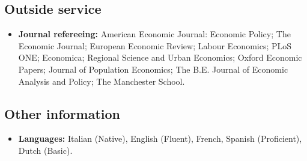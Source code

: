 \documentclass[11pt]{article}
\begin{document}
\subsection*{\sc Outside service}

\begin{itemize}[itemsep=.9pt, leftmargin=20pt]
    \item[]\textbf{Journal refereeing:} American Economic Journal: Economic Policy; The Economic Journal; European Economic Review; Labour Economics; PLoS ONE; Economica; Regional Science and Urban Economics; Oxford Economic Papers; Journal of Population Economics; The B.E. Journal of Economic Analysis and Policy; The Manchester School.
\end{itemize}

\subsection*{\sc Other information}
\begin{itemize}[itemsep=.9pt, leftmargin=20pt]
    \item[]\textbf{Languages:} Italian (Native), English (Fluent), French, Spanish (Proficient), Dutch (Basic).
\end{itemize}
\end{document}
